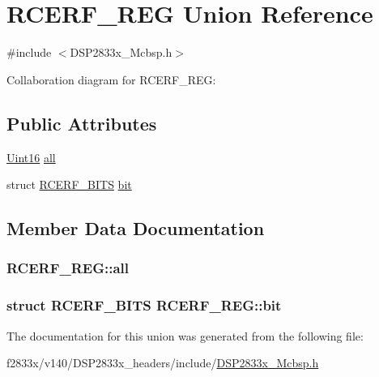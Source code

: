 \hypertarget{union_r_c_e_r_f___r_e_g}{}\section{R\+C\+E\+R\+F\+\_\+\+R\+E\+G Union Reference}
\label{union_r_c_e_r_f___r_e_g}


{\ttfamily \#include $<$D\+S\+P2833x\+\_\+\+Mcbsp.\+h$>$}



Collaboration diagram for R\+C\+E\+R\+F\+\_\+\+R\+E\+G\+:
\subsection*{Public Attributes}
\begin{DoxyCompactItemize}
\item 
\hyperlink{_d_s_p2833x___device_8h_a59a9f6be4562c327cbfb4f7e8e18f08b}{Uint16} \hyperlink{union_r_c_e_r_f___r_e_g_a54ec13832825b35ec562939bb8f8854a}{all}
\item 
struct \hyperlink{struct_r_c_e_r_f___b_i_t_s}{R\+C\+E\+R\+F\+\_\+\+B\+I\+T\+S} \hyperlink{union_r_c_e_r_f___r_e_g_abf68dda2c2f01b920a7e01248bd76714}{bit}
\end{DoxyCompactItemize}


\subsection{Member Data Documentation}
\hypertarget{union_r_c_e_r_f___r_e_g_a54ec13832825b35ec562939bb8f8854a}{}
\subsubsection[{all}]{ R\+C\+E\+R\+F\+\_\+\+R\+E\+G\+::all}\label{union_r_c_e_r_f___r_e_g_a54ec13832825b35ec562939bb8f8854a}
\hypertarget{union_r_c_e_r_f___r_e_g_abf68dda2c2f01b920a7e01248bd76714}{}
\subsubsection[{bit}]{\setlength{\rightskip}{0pt plus 5cm}struct {\bf R\+C\+E\+R\+F\+\_\+\+B\+I\+T\+S} R\+C\+E\+R\+F\+\_\+\+R\+E\+G\+::bit}\label{union_r_c_e_r_f___r_e_g_abf68dda2c2f01b920a7e01248bd76714}


The documentation for this union was generated from the following file\+:\begin{DoxyCompactItemize}
\item 
f2833x/v140/\+D\+S\+P2833x\+\_\+headers/include/\hyperlink{_d_s_p2833x___mcbsp_8h}{D\+S\+P2833x\+\_\+\+Mcbsp.\+h}\end{DoxyCompactItemize}
